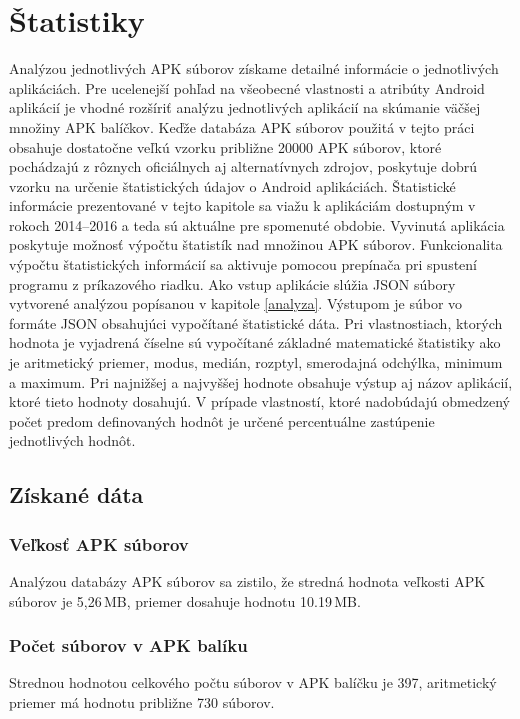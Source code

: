 \chapter{Štatistiky}
\label{statistiky}
Analýzou jednotlivých APK súborov získame detailné informácie o jednotlivých aplikáciách. Pre ucelenejší pohľad na všeobecné vlastnosti a atribúty Android aplikácií je vhodné rozšíriť analýzu jednotlivých aplikácií na skúmanie väčšej množiny APK balíčkov. Keďže databáza APK súborov použitá v tejto práci obsahuje dostatočne veľkú vzorku približne 20000 APK súborov, ktoré pochádzajú z rôznych oficiálnych aj alternatívnych zdrojov, poskytuje dobrú vzorku na určenie štatistických údajov o Android aplikáciách. Štatistické informácie prezentované v tejto kapitole sa viažu k aplikáciám dostupným v rokoch 2014--2016 a teda sú aktuálne pre spomenuté obdobie.
Vyvinutá aplikácia  poskytuje možnosť výpočtu štatistík nad množinou APK súborov. Funkcionalita výpočtu štatistických informácií sa aktivuje pomocou prepínača  pri spustení programu z príkazového riadku. Ako vstup aplikácie slúžia JSON súbory vytvorené analýzou popísanou v kapitole \ref{analyza}. Výstupom je súbor vo formáte JSON obsahujúci vypočítané štatistické dáta. Pri vlastnostiach, ktorých hodnota je vyjadrená číselne sú vypočítané základné matematické štatistiky ako je aritmetický priemer, modus, medián, rozptyl, smerodajná odchýlka, minimum a maximum. Pri najnižšej a najvyššej hodnote obsahuje výstup aj názov aplikácií, ktoré tieto hodnoty dosahujú. V prípade vlastností, ktoré nadobúdajú obmedzený počet predom definovaných hodnôt je určené percentuálne zastúpenie jednotlivých hodnôt.

\section{Získané dáta}
\subsection*{Veľkosť APK súborov}
Analýzou databázy APK súborov sa zistilo, že stredná hodnota veľkosti APK súborov je 5,26\,MB, priemer dosahuje hodnotu 10.19\,MB.

\subsection*{Počet súborov v APK balíku}
Strednou hodnotou celkového počtu súborov v APK balíčku je 397, aritmetický priemer má hodnotu približne 730 súborov. 

